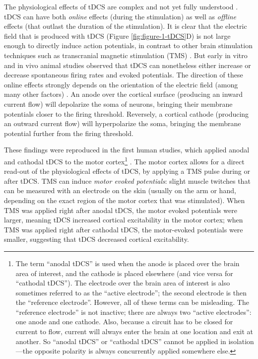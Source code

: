 \documentclass[11pt,english,]{memoir}
\let\rmarkdownfootnote\footnote%
\def\footnote{\protect\rmarkdownfootnote}
\begin{document}
The physiological effects of tDCS are complex and not yet fully understood \autocites{Jackson2016}{Liu2018}{Pelletier2015}{Stagg2018}. tDCS can have both \emph{online} effects (during the stimulation) as well as \emph{offline} effects (that outlast the duration of the stimulation). It is clear that the electric field that is produced with tDCS (Figure \ref{fig:figure-1-tDCS}D) is not large enough to directly induce action potentials, in contrast to other brain stimulation techniques such as transcranial magnetic stimulation (TMS) \autocite{Parkin2015}. But early in vitro \autocite{Terzuolo1956} and in vivo \autocites{Bindman1964}{Creutzfeldt1962}{Landau1964}{Purpura1965} animal studies observed that tDCS can nonetheless either increase or decrease spontaneous firing rates and evoked potentials. The direction of these online effects strongly depends on the orientation of the electric field (among many other factors) \autocite{Bikson2019}. An anode over the cortical surface (producing an inward current flow) will depolarize the soma of neurons, bringing their membrane potentials closer to the firing threshold. Reversely, a cortical cathode (producing an outward current flow) will hyperpolarize the soma, bringing the membrane potential further from the firing threshold.

These findings were reproduced in the first human studies, which applied anodal and cathodal tDCS to the motor cortex\footnote{The term ``anodal tDCS'' is used when the anode is placed over the brain area of interest, and the cathode is placed elsewhere (and vice versa for ``cathodal tDCS''). The electrode over the brain area of interest is also sometimes referred to as the ``active electrode''; the second electrode is then the ``reference electrode''. However, all of these terms can be misleading. The ``reference electrode'' is not inactive; there are always two ``active electrodes'': one anode and one cathode. Also, because a circuit has to be closed for current to flow, current will always enter the brain at one location and exit at another. So ``anodal tDCS'' or ``cathodal tDCS'' cannot be applied in isolation---the opposite polarity is always concurrently applied somewhere else.} \autocites{Nitsche2000}{Nitsche2001}. The motor cortex allows for a direct read-out of the physiological effects of tDCS, by applying a TMS pulse during or after tDCS. TMS can induce \emph{motor evoked potentials}: slight muscle twitches that can be measured with an electrode on the skin (usually on the arm or hand, depending on the exact region of the motor cortex that was stimulated). When TMS was applied right after anodal tDCS, the motor evoked potentials were larger, meaning tDCS increased cortical excitability in the motor cortex; when TMS was applied right after cathodal tDCS, the motor-evoked potentials were smaller, suggesting that tDCS decreased cortical excitability.
\end{document}
